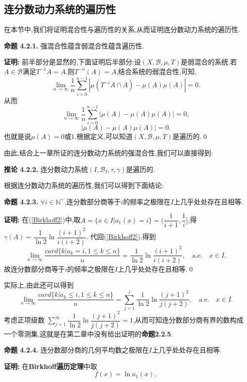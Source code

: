 \subsection{连分数动力系统的遍历性}
在本节中,我们将证明混合性与遍历性的关系,从而证明连分数动力系统的遍历性.\par
\textbf{命题 4.2.1.  }\textsuperscript{\cite{Ergodicity_and_mixing}}
强混合性蕴含弱混合性蕴含遍历性.
\par
\textbf{证明:  }
前半部分是显然的,下面证明后半部分:设$(X,\mathcal{B},\mu,T)$是弱混合的系统.若$A\in\mathcal{B}$满足$T^{-1}A=A$.则$T^{-n}(A)=A$,结合系统的弱混合性,可知,
$$\lim_{n\to\infty}{\frac{1}{n}}\sum_{i=0}^{n-1}|\mu(T^{-i}A\cap A)-\mu(A)\mu(A)|=0.$$
从而
$$\lim_{n\to\infty}{\frac{1}{n}}\sum_{i=0}^{n-1}|\mu(A)-\mu(A)\mu(A)|=0,$$
$$|\mu(A)-\mu(A)\mu(A)|=0.$$
也就是说$\mu(A)=0$或$1$.根据定义,可以知道$(X,\mathcal{B},\mu,T)$是遍历的.\qed
\par
由此,结合上一章所证的连分数动力系统的强混合性,我们可以直接得到:\par
\textbf{推论 4.2.2.  }\textsuperscript{\cite{Ergodic_theory,Ergodicity_and_mixing}}
连分数动力系统$(I,\mathcal{B}_I,\tau,\gamma)$是遍历的.
\par
根据连分数动力系统的遍历性,我们可以得到下面结论:\par
\textbf{命题 4.2.3.  }\textsuperscript{\cite{Ergodic_theory}}
$\forall i\in\mathbb{N^+}$,连分数部分商等于$i$的频率之极限在$I$上几乎处处存在且相等.
\par
\textbf{证明:  }
在(\ref{Birkhoff2})中,取$A=\{x\in I|a_1(x)=i\}=(\dfrac{1}{i+1},\dfrac{1}{i}]$,得$\gamma(A)=\dfrac{1}{\ln2}\ln\dfrac{(i+1)^2}{i(i+2)}$.
代回(\ref{Birkhoff2}),得到
$$\lim\limits_{n\to\infty}\frac{card\{k|a_k=i,1\leqslant k\leqslant n\}}{n}=\frac{1}{\ln2}\ln\dfrac{(i+1)^2}{i(i+2)},\quad\mathrm{a.e.}\quad x\in I.$$
故连分数部分商等于$i$的频率之极限在$I$上几乎处处存在且相等.\qed
\par
实际上,由此还可以得到
$$\lim\limits_{n\to\infty}\frac{card\{k|a_k\leqslant i,1\leqslant k\leqslant n\}}{n}=\sum_{j=1}^{i}\frac{1}{\ln2}\ln\dfrac{(j+1)^2}{j(j+2)},\quad\mathrm{a.e.}\quad x\in I.$$
考虑正项级数
$\sum\limits_{j=1}^{\infty}\dfrac{1}{\ln2}\ln\dfrac{(j+1)^2}{j(j+2)}=1$,从而可知连分数部分商有界的数构成一个零测集,这就是在第二章中没有给出证明的\textbf{命题2.2.5}.\par
\textbf{命题 4.2.4.  }\textsuperscript{\cite{Ergodic_theory}}
连分数部分商的几何平均数之极限在$I$上几乎处处存在且相等.
\par
\textbf{证明:  }
在\textbf{Birkhoff遍历定理}中取
$$f(x) =\ln a_1(x),$$
